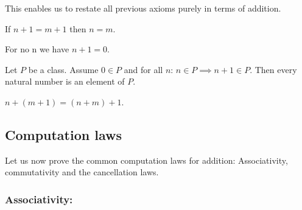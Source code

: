 \documentclass[../../arithmetic.ftl.tex]{subfiles}
\begin{document}
  This enables us to restate all previous axioms purely in terms of addition.

  \begin{forthel}
    \begin{corollary}\label{Arithmetic_01_02_631603}
      If $n + 1 = m + 1$ then $n = m$.
    \end{corollary}

    \begin{corollary}\label{Arithmetic_01_02_329014}
      For no n we have $n + 1 = 0$.
    \end{corollary}

    \begin{corollary}\label{Arithmetic_01_02_253087}
      Let $P$ be a class.
      Assume $0 \in P$ and for all $n$: $n \in P \implies n + 1 \in P$.
      Then every natural number is an element of $P$.
    \end{corollary}

    \begin{corollary}\label{Arithmetic_01_02_117171}
      $n + (m + 1) = (n + m) + 1$.
    \end{corollary}
  \end{forthel}


  \subsection{Computation laws}

  Let us now prove the common computation laws for addition: Associativity,
  commutativity and the cancellation laws.


  \subsubsection*{Associativity:}
\end{document}
